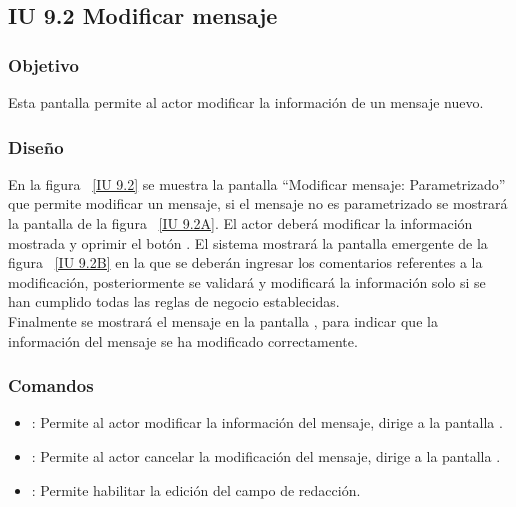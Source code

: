 \newpage 
\subsection{IU 9.2 Modificar mensaje}

\subsubsection{Objetivo}
	
	Esta pantalla permite al actor modificar la información de un mensaje nuevo.

\subsubsection{Diseño}

    En la figura ~\ref{IU 9.2} se muestra la pantalla ``Modificar mensaje: Parametrizado'' que permite modificar un mensaje, si el mensaje no es parametrizado se mostrará la pantalla de la figura ~\ref{IU 9.2A}. El actor deberá modificar la información mostrada y oprimir el botón . El sistema mostrará la pantalla emergente de la figura ~\ref{IU 9.2B} en la que se deberán ingresar los comentarios referentes a la modificación, posteriormente se validará y modificará la información solo si se han cumplido todas las reglas de negocio establecidas. \\
    
    Finalmente se mostrará el mensaje  en la pantalla , para indicar que la información del mensaje
    se ha modificado correctamente.        

	

\subsubsection{Comandos}
\begin{itemize}
	\item {}: Permite al actor modificar la información del mensaje, dirige a la pantalla .
	\item {}: Permite al actor cancelar la modificación del mensaje, dirige a la pantalla .
	\item \btnEditar: Permite habilitar la edición del campo de redacción.
	
\end{itemize}

